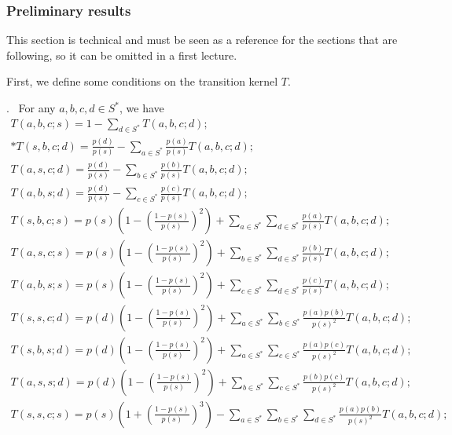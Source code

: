 \documentclass[10pt]{amsart}
\theoremstyle{definition}\newtheorem{defi}[theo]{Definition}\newtheorem{rema}[theo]{Remark}\newtheorem{exam}[theo]{Example}\newtheorem{exem}[theo]{Example}\newtheorem{nota}[theo]{Notation}
\newcounter{a}
\newenvironment{cond}{\refstepcounter{a}{\upshape\emph{Cond.~\thea}}\pointir}{}
\providecommand{\pointir}{.\ }
\begin{document}
\subsubsection{Preliminary results}

This section is technical and must be seen as a reference for the sections that are following, so it can be omitted in a first lecture.

First, we define some conditions on the transition kernel $T$.


\begin{cond} \label{cond:Ts}
For any $a,b,c,d \in S^*$, we have
\begingroup
\allowdisplaybreaks
\begin{gather}\label{eq:Ts-abcs}
T(a,b,c;s) = 1 - \sum_{d \in S^*} T(a,b,c;d);
\\*
\label{eq:Ts-sbcd}
T(s,b,c;d) = \frac{p(d)}{p(s)} - \sum_{a \in S^*} \frac{p(a)}{p(s)} T(a,b,c;d);
\\
\label{eq:Ts-ascd}
T(a,s,c;d) = \frac{p(d)}{p(s)} - \sum_{b \in S^*} \frac{p(b)}{p(s)} T(a,b,c;d);
\\
\label{eq:Ts-absd}
T(a,b,s;d) = \frac{p(d)}{p(s)} - \sum_{c \in S^*} \frac{p(c)}{p(s)} T(a,b,c;d);
\\
\label{eq:Ts-sbcs}
T(s,b,c;s) = p(s) \left(1 - \left(\frac{1-p(s)}{p(s)} \right)^2 \right) + \sum_{a \in S^*} \sum_{d \in S^*} \frac{p(a)}{p(s)}T(a,b,c;d);
\\
\label{eq:Ts-ascs}
T(a,s,c;s) = p(s) \left(1 - \left(\frac{1-p(s)}{p(s)} \right)^2 \right) + \sum_{b \in S^*} \sum_{d \in S^*} \frac{p(b)}{p(s)}T(a,b,c;d);
\\
\label{eq:Ts-abss}
T(a,b,s;s) = p(s) \left(1 - \left(\frac{1-p(s)}{p(s)} \right)^2 \right) + \sum_{c \in S^*} \sum_{d \in S^*} \frac{p(c)}{p(s)}T(a,b,c;d);
\\
\label{eq:Ts-sscd}
T(s,s,c;d) = p(d) \left(1 - \left(\frac{1-p(s)}{p(s)} \right)^2 \right) + \sum_{a \in S^*} \sum_{b \in S^*} \frac{p(a)p(b)}{p(s)^2}T(a,b,c;d);
\\
\label{eq:Ts-sbsd}
T(s,b,s;d) = p(d) \left(1 - \left(\frac{1-p(s)}{p(s)} \right)^2 \right) + \sum_{a \in S^*} \sum_{c \in S^*} \frac{p(a)p(c)}{p(s)^2}T(a,b,c;d);
\\
\label{eq:Ts-assd}
T(a,s,s;d) = p(d) \left(1 - \left(\frac{1-p(s)}{p(s)} \right)^2 \right) + \sum_{b \in S^*} \sum_{c \in S^*} \frac{p(b)p(c)}{p(s)^2}T(a,b,c;d);
\\
\label{eq:Ts-sscs}
T(s,s,c;s) = p(s) \left(1 + \left(\frac{1-p(s)}{p(s)} \right)^3 \right) - \sum_{a \in S^*} \sum_{b \in S^*} \sum_{d \in S^*} \frac{p(a)p(b)}{p(s)^2}T(a,b,c;d);

\end{gather}
\end{cond}
\end{document}
